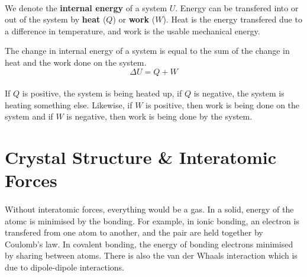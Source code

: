 \documentclass[../thermodynamics.tex]{subfiles}
\begin{document}
        \paragraph{}
        We denote the \textbf{internal energy} of a system $U$.
        Energy can be transfered into or out of the system by \textbf{heat} ($Q$) or \textbf{work} ($W$).
        Heat is the energy transfered due to a difference in temperature, and work is the usable mechanical energy.
        \begin{definition}
            The change in internal energy of a system is equal to the sum of the change in heat and the work done on the system.
            \begin{equation}
                \Delta U=Q+W
            \end{equation}
        \end{definition}

        \paragraph{}
        If $Q$ is positive, the system is being heated up, if $Q$ is negative, the system is heating something else.
        Likewise, if $W$ is positive, then work is being done on the system and if $W$ is negative, then work is being done by the system.

    \section{Crystal Structure \& Interatomic Forces}
        \paragraph{}
        Without interatomic forces, everything would be a gas.
        In a solid, energy of the atomc is minimised by the bonding.
        For example, in ionic bonding, an electron is transfered from one atom to another, and the pair are held together by Coulomb's law.
        In covalent bonding, the energy of bonding electrons minimised by sharing between atoms.
        There is also the van der Whaals interaction which is due to dipole-dipole interactions.
\end{document}
